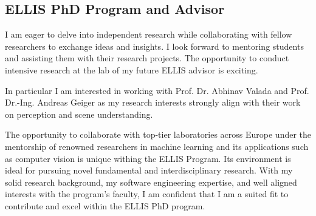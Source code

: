 \subsection{\textbf{ELLIS PhD Program and Advisor}}
I am eager to delve into independent research while collaborating with fellow researchers to exchange ideas and insights. I look forward to mentoring students and assisting them with their research projects. The opportunity to conduct intensive research at the lab of my future ELLIS advisor is exciting. 

In particular I am interested in working with Prof. Dr. Abhinav Valada and Prof. Dr.-Ing. Andreas Geiger as my research interests strongly align with their work on perception and scene understanding.

The opportunity to collaborate with top-tier laboratories across Europe under the mentorship of renowned researchers in machine learning and its applications such as computer vision is unique withing the ELLIS Program. Its environment is ideal for pursuing novel fundamental and interdisciplinary research. With my solid research background, my software engineering expertise, and well aligned interests with the program’s faculty, I am confident that I am a suited fit to contribute and excel within the ELLIS PhD program.